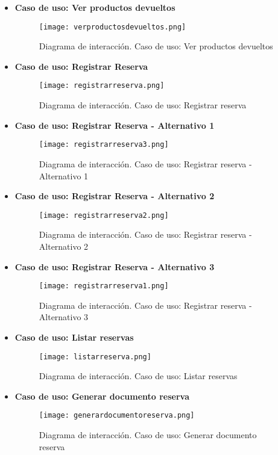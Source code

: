 \begin{itemize}
\item \textbf{Caso de uso: Ver productos devueltos}
\begin{figure}[!htb]
  \centering
    \texttt{[image: verproductosdevueltos.png]}
  \caption{Diagrama de interacción. Caso de uso: Ver productos devueltos}
  \label{a}
\end{figure}
\newpage
\item \textbf{Caso de uso: Registrar Reserva}
\begin{figure}[!htb]
  \centering
    \texttt{[image: registrarreserva.png]}
  \caption{Diagrama de interacción. Caso de uso: Registrar reserva}
  \label{a}
\end{figure}
\newpage
\item \textbf{Caso de uso: Registrar Reserva - Alternativo 1}
\begin{figure}[!htb]
  \centering
    \texttt{[image: registrarreserva3.png]}
  \caption{Diagrama de interacción. Caso de uso: Registrar reserva - Alternativo 1}
  \label{a}
\end{figure}
\item \textbf{Caso de uso: Registrar Reserva - Alternativo 2}
\begin{figure}[!htb]
  \centering
    \texttt{[image: registrarreserva2.png]}
  \caption{Diagrama de interacción. Caso de uso: Registrar reserva - Alternativo 2}
  \label{a}
\end{figure}

\item \textbf{Caso de uso: Registrar Reserva - Alternativo 3}
\begin{figure}[!htb]
  \centering
    \texttt{[image: registrarreserva1.png]}
  \caption{Diagrama de interacción. Caso de uso: Registrar reserva -Alternativo 3}
  \label{a}
\end{figure}

\newpage
\item \textbf{Caso de uso: Listar reservas}
\begin{figure}[!htb]
  \centering
    \texttt{[image: listarreserva.png]}
  \caption{Diagrama de interacción. Caso de uso: Listar reservas}
  \label{a}
\end{figure}

\item \textbf{Caso de uso: Generar documento reserva}
\begin{figure}[!htb]
  \centering
    \texttt{[image: generardocumentoreserva.png]}
  \caption{Diagrama de interacción. Caso de uso: Generar documento reserva}
  \label{a}
\end{figure}


\end{itemize}
